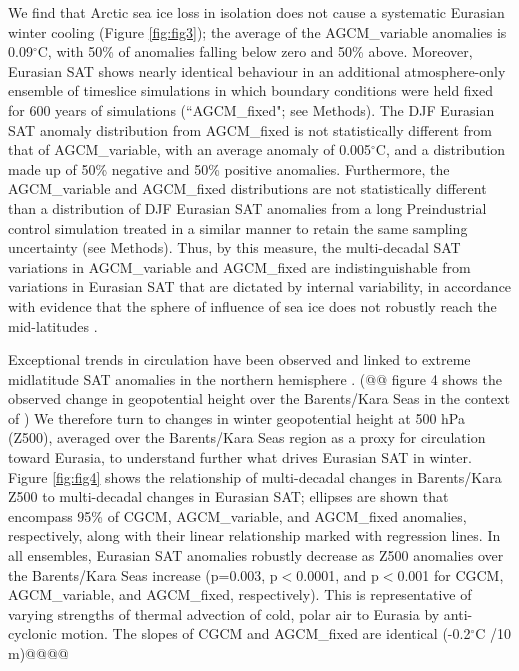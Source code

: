 \documentclass{nature}
\begin{document}
We find that Arctic sea ice loss in isolation does not cause a systematic Eurasian winter cooling (Figure \ref{fig:fig3}); the average of the AGCM\_variable anomalies is 0.09$^\circ$C, with 50\% of anomalies falling below zero and 50\% above. Moreover, Eurasian SAT shows nearly identical behaviour in an additional atmosphere-only ensemble of timeslice simulations in which boundary conditions were held fixed for 600 years of simulations (``AGCM\_fixed"; see Methods). The DJF Eurasian SAT anomaly distribution from AGCM\_fixed is not statistically different from that of AGCM\_variable, with an average anomaly of 0.005$^\circ$C, and a distribution made up of 50\% negative and 50\% positive anomalies. Furthermore, the AGCM\_variable and AGCM\_fixed distributions are not statistically different than a distribution of DJF Eurasian SAT anomalies from a long Preindustrial control simulation treated in a similar manner to retain the same sampling uncertainty (see Methods). Thus, by this measure, the multi-decadal SAT variations in AGCM\_variable and AGCM\_fixed are indistinguishable from variations in Eurasian SAT that are dictated by internal variability, in accordance with evidence that the sphere of influence of sea ice does not robustly reach the mid-latitudes \cite{screen14a}.  %


Exceptional trends in circulation have been observed and linked to extreme midlatitude SAT anomalies in the northern hemisphere \cite{horton15, sigmond15}. (@@ figure 4 shows the observed change in geopotential height over the Barents/Kara Seas in the context of ) We therefore turn to changes in winter geopotential height at 500 hPa (Z500), averaged over the Barents/Kara Seas region as a proxy for circulation toward Eurasia, to understand further what drives Eurasian SAT in winter. Figure \ref{fig:fig4} shows the relationship of multi-decadal changes in Barents/Kara Z500 to multi-decadal changes in Eurasian SAT; ellipses are shown that encompass 95\% of CGCM, AGCM\_variable, and AGCM\_fixed anomalies, respectively, along with their linear relationship marked with regression lines. In all ensembles, Eurasian SAT anomalies robustly decrease as Z500 anomalies over the Barents/Kara Seas increase (p=0.003, p$<$0.0001, and p$<$0.001 for CGCM, AGCM\_variable, and AGCM\_fixed, respectively). This is representative of varying strengths of thermal advection of cold, polar air to Eurasia by anti-cyclonic motion. The slopes of CGCM and AGCM\_fixed are identical (-0.2$^\circ$C /10 m)@@@@
\end{document}
